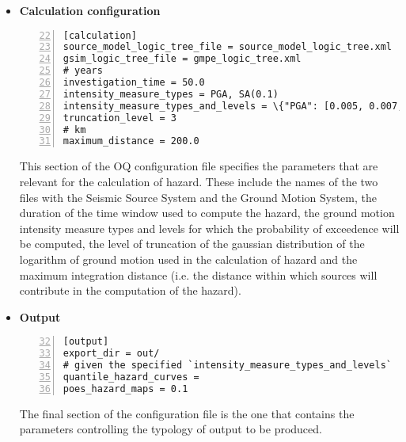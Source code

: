 \begin{itemize}
%
\item \textbf{Calculation configuration}
\label{sec:calculation_configuration}
\begin{Verbatim}[frame=single, commandchars=\\\{\}, fontsize=\small,
     firstnumber=22, numbers=left, numbersep=2pt]
[calculation]
source_model_logic_tree_file = source_model_logic_tree.xml
gsim_logic_tree_file = gmpe_logic_tree.xml
# years
investigation_time = 50.0
intensity_measure_types = PGA, SA(0.1)
intensity_measure_types_and_levels = \{"PGA": [0.005, 0.007, ..., 2.13]\} 
truncation_level = 3
# km
maximum_distance = 200.0
\end{Verbatim}
This section of the OQ configuration file specifies the parameters that
are relevant for the calculation of hazard. These include the names of
the two files with the Seismic Source System and the Ground Motion System,
the duration of the time window used to compute the hazard, the ground 
motion intensity measure types and levels for which the probability of 
exceedence will be computed, the level of truncation of the gaussian 
distribution of the logarithm of ground motion used in the calculation 
of hazard and the maximum integration distance (i.e. the distance within 
which sources will contribute in the computation of the hazard).
%
\item \textbf{Output}
\begin{Verbatim}[frame=single, commandchars=\\\{\}, fontsize=\small,
    firstnumber=32, numbers=left, numbersep=2pt]
[output]
export_dir = out/
# given the specified `intensity_measure_types_and_levels`
quantile_hazard_curves =
poes_hazard_maps = 0.1
\end{Verbatim}
The final section of the configuration file is the one that contains 
the parameters controlling the typology of output to be produced.
%
\end{itemize}
%
%
%
